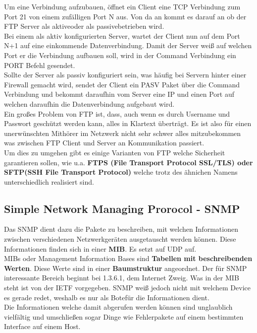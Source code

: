 \documentclass[12pt,a4paper]{report}
\begin{document}
Um eine Verbindung aufzubauen, öffnet ein Client eine TCP Verbindung zum Port 21 von einem zufälligen Port N aus. Von da an kommt es darauf an ob der FTP Server als \glqq aktive\grqq oder als \glqq passive\grqq betrieben wird.\\
Bei einem als aktiv konfigurierten Server, wartet der Client nun auf dem Port N+1 auf eine einkommende Datenverbindung. Damit der Server weiß auf welchen Port er die Verbindung aufbauen soll, wird in der Command Verbindung ein PORT Befehl gesendet.\\
Sollte der Server als passiv konfiguriert sein, was häufig bei Servern hinter einer Firewall gemacht wird, sendet der Client ein PASV Paket über die Command Verbindung und bekommt daraufhin vom Server eine IP und einen Port auf welchen daraufhin die Datenverbindung aufgebaut wird.\\

Ein großes Problem von FTP ist, dass, auch wenn es durch Username und Passwort geschützt werden kann, alles in Klartext überträgt. Es ist also für einen unerwünschten Mithörer im Netzwerk nicht sehr schwer alles mitzubekommen was zwischen FTP Client und Server an Kommunikation passiert.\\
Um dies zu umgehen gibt es einige Varianten von FTP welche Sicherheit garantieren sollen, wie u.a. \textbf{FTPS (File Transport Protocol SSL/TLS) oder SFTP(SSH File Transport Protocol)} welche trotz des ähnichen Namens unterschiedlich realisiert sind. 
 
\subsection{Simple Network Managing Prorocol - SNMP}
Das SNMP dient dazu die Pakete zu beschreiben, mit welchen Informationen zwischen verschiedenen Netzwerkgeräten ausgetauscht werden können. Diese Informationen finden sich in einer \textbf{MIB}. Es setzt auf UDP auf.\\

MIBs oder Management Information Bases sind \textbf{Tabellen mit beschreibenden Werten}. Diese Werte sind in einer \textbf{Baumstruktur} angeordnet. Der für SNMP interessante Bereich beginnt bei 1.3.6.1, dem Internet Zweig. Was in der MIB steht ist von der IETF vorgegeben. SNMP weiß jedoch nicht mit welchem Device es gerade redet, weshalb es nur als \glqq Bote\grqq für die Informationen dient.\\
Die Informationen welche damit abgerufen werden können sind unglaublich vielfältig und umschließen sogar Dinge wie Fehlerpakete auf einem bestimmten Interface auf einem Host.\\
\end{document}

